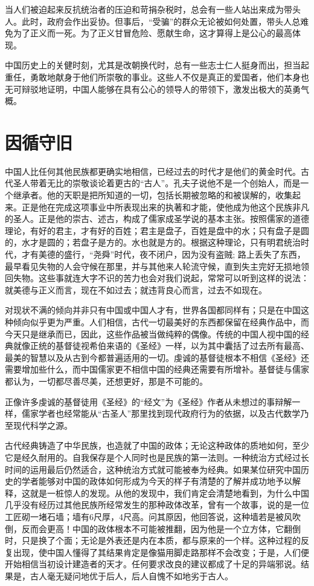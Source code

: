 \documentclass[12pt,oneside]{book}
\begin{document}
\begin{common-format}
当人们被迫起来反抗统治者的压迫和苛捐杂税时，总会有一些人站出来成为带头人。此时，政府会作出妥协。但事后，“受骗”的群众无论被如何处置，带头人总难免为了正义而一死。为了正义甘冒危险、愿献生命，这才算得上是公心的最高体现。 

中国历史上的关健时刻，尤其是改朝换代时，总有一些志士仁人挺身而出，担当起重任，勇敢地献身于他们所崇敬的事业。这些人不仅是真正的爱国者，他们本身也无可辩驳地证明，中国人能够在具有公心的领导人的带领下，激发出极大的英勇气概。 

\chapter{因循守旧}
中国人比任何其他民族都更确实地相信，已经过去的时代才是他们的黄金时代。古代圣人带着无比的崇敬谈论着更古的“古人”。孔夫子说他不是一个创始人，而是一个继承者。他的天职是把所知道的一切，包括长期被忽略的和被误解的，收集起来。正是他在完成这项事业中所表现出来的执著和才能，使他成为他这个民族非凡的圣人。正是他的崇古、述古，构成了儒家成圣学说的基本主张。按照儒家的道德理论，有好的君主，才有好的百姓；君主是盘子，百姓是盘中的水；只有盘子是圆的，水才是圆的；若盘子是方的。水也就是方的。根据这种理论，只有明君统治时代，才有美德的盛行，“尧舜”时代，夜不闭户，因为没有盗贼; 路上丢失了东西，最早看见失物的人会守候在那里，并与其他来人轮流守候，直到失主完好无损地领回失物。这些事就连大字不识的苦力也会对我们说起，常常可以听到这样的说法：就美德与正义而言，现在不如过去；就违背良心而言，过去不如现在。 

对现状不满的倾向并非只有中国或中国人才有，世界各国都同样有；只是在中国这种倾向似乎更为严重。人们相信，古代一切最美好的东西都保留在经典作品中，而今天只是继承而已，因此，这些作品被当做纯粹的偶像。传统的中国人视中国的经典就像正统的基督徒视希伯来语的《圣经》一样，以为其中囊括了过去所有最高、最美的智慧以及从古到今都普遍适用的一切。虔诚的基督徒根本不相信《圣经》还需要增加些什么，而中国儒家更不相信中国的经典还需要有所增补。基督徒与儒家都认为，一切都尽善尽美，还想更好，那是不可能的。 

正像许多虔诚的基督徒用《圣经》的“经文”为《圣经》作者从未想过的事辩解一样，儒家学者也经常能从“古圣人”那里找到现代政府行为的依据，以及古代数学乃至现代科学之源。 

古代经典铸造了中华民族，也造就了中国的政体；无论这种政体的质地如何，至少它是经久耐用的。自我保存是个人同时也是民族的第一法则。一种统治方式经过长时间的运用最后仍然适合，这种统治方式就可能被奉为经典。如果某位研究中国历史的学者能够对中国的政体如何形成为今天的样子有清楚的了解并成功地予以解释，这就是一桩惊人的发现。从他的发现中，我们肯定会清楚地看到，为什么中国几乎没有经历过其他民族所经常发生的那种政体改革，曾有一个故事，说的是一位工匠砌一堵石墙；墙有6尺厚，4尺高。问其原因，他回答说，这种墙若是被风吹倒，反而会更高！中国的政体根本不可能被推翻，因为他是一个立方体，它翻倒时，只是换了个面；无论是外表还是内在本质，都与原来的一个样。这种过程的反复出现，使中国人懂得了其结果肯定是像猫用脚走路那样不会改变；于是，人们便开始相信当初设计建造者的天才。任何要求改良的建议都成了十足的异端邪说。结果是，古人毫无疑问地优于后人，后人自愧不如地劣于古人。 


\end{common-format}
\end{document}
